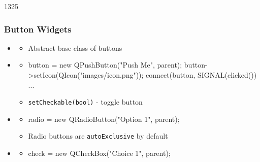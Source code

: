 \begin{slide}[fragile]{1325}
  \frametitle{Button Widgets}
 \begin{itemize}
  \item \textbf{}
    \begin{itemize}
    \item Abstract base class of buttons
   \end{itemize}
  \item \textbf{}
    \begin{itemize}
    \item[]
      \begin{cpp}
button = new QPushButton("Push Me", parent);
button->setIcon(QIcon("images/icon.png"));
connect(button, SIGNAL(clicked()) ...
      \end{cpp}
    \item \texttt{setCheckable(bool)} - toggle button
    \end{itemize}
 \item \textbf{}
   \begin{itemize}
   \item[]
     \begin{cpp}
radio = new QRadioButton("Option 1", parent);
     \end{cpp}
   \item Radio buttons are \texttt{autoExclusive} by default
   \end{itemize}
  \item \textbf{}
    \begin{itemize}
     \item[] \begin{cpp}
check = new QCheckBox("Choice 1", parent);
     \end{cpp}
  \end{itemize}
  \end{itemize}
\end{slide}

